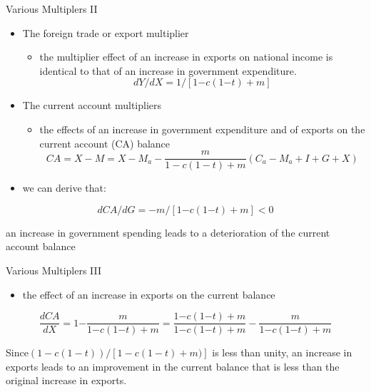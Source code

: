 \documentclass[10pt,hyperref={CJKbookmarks=true},xcolor=dvipsnames,aspectratio=169]{beamer}
\begin{document}
\begin{frame}{Various Multiplers II}

\begin{itemize}
\item The foreign trade or export multiplier

\begin{itemize}
\item the multiplier effect of an increase in exports on national income
is identical to that of an increase in government expenditure.
\[
dY/dX=1/[1\text{−}c(1\text{−}t)+m]
\]

\end{itemize}
\item The current account multipliers

\begin{itemize}
\item the effects of an increase in government expenditure and of exports
on the current account (CA) balance
\[
CA=X-M=X-M_{a}-\frac{m}{1-c(1-t)+m}\left(C_{a}-M_{a}+I+G+X\right)
\]

\end{itemize}
\item we can derive that:
\end{itemize}

\[
dCA/dG=\text{−}m/[1\text{−}c(1\text{−}t)+m]<0
\]

\begin{theorem}
an increase in government spending leads to a deterioration of the
current account balance
\end{theorem}

\end{frame}

\begin{frame}{Various Multiplers III}

\begin{itemize}
\item the effect of an increase in exports on the current balance
\end{itemize}

\[
\frac{dCA}{dX}=\text{1−}\frac{m}{1\text{−}c(1\text{−}t)+m}=\frac{1\text{−}c(1\text{−}t)+m}{1\text{−}c(1\text{−}t)+m}-\frac{m}{1\text{−}c(1\text{−}t)+m}
\]



\begin{block}{Since$(1-c(1-t))/[1-c(1-t)+m)]$ is less than unity, an increase in
exports leads to an improvement in the current balance that is less
than the original increase in exports.}

\end{block}
\end{frame}
\end{document}
